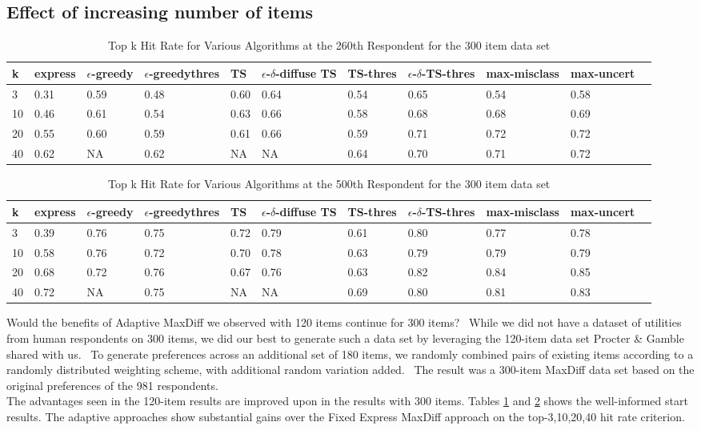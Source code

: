 \documentclass[nonblindrev]{informs3}
\newcommand{\fixedexpress}{\textbf{express}}
\newcommand{\egreedy}{$\epsilon$-\textbf{greedy}}
\newcommand{\egreedythres}{$\epsilon$-\textbf{greedythres}}
\newcommand{\mismin}{\textbf{max-misclass}}
\newcommand{\ts}{\textbf{TS} }
\newcommand{\edts}{$\epsilon$-$\delta$-\textbf{diffuse TS} }
\newcommand{\tsthres}{\textbf{TS-thres} }
\newcommand{\edtsthres}{$\epsilon$-$\delta$-\textbf{TS-thres} }
\newcommand{\uncert}{\textbf{max-uncert} }
\begin{document}
\subsection{Effect of increasing number of items}
\begin{table}
\begin{center}
\begin{tabular}{lllllllllll}
\hline   k &  \fixedexpress & \egreedy&\egreedythres&\ts&\edts&\tsthres&\edtsthres& \mismin& \uncert \\ \hline 
3&   0.31 &   0.59 & 0.48 & 0.60 &  0.64 & 0.54 & 0.65 & 0.54 &   0.58 \\ 
10 & 0.46 &   0.61 & 0.54 & 0.63  & 0.66 & 0.58 & 0.68 & 0.68  &   0.69 \\ 
20 & 0.55 &   0.60 & 0.59 &  0.61 & 0.66 & 0.59 & 0.71 &       0.72 &   0.72\\ 
40 & 0.62 &   NA & 0.62 & NA &  NA & 0.64 & 0.70 & 0.71 & 0.72 \end{tabular}
\end{center}
\caption{Top k Hit Rate for Various Algorithms at the 260th Respondent for the 300 item data set}
\label{table:300at260}
\end{table}

\begin{table}
\begin{center}
\begin{tabular}{lllllllllll}
\hline   k &  \fixedexpress & \egreedy&\egreedythres&\ts&\edts&\tsthres&\edtsthres& \mismin& \uncert  \\ \hline  
3 & 0.39 &  0.76 & 0.75 & 0.72 & 0.79 & 0.61 &  0.80 &  0.77 &0.78 \\
10 &  0.58 &   0.76 & 0.72 & 0.70 & 0.78 & 0.63 & 0.79 & 0.79 &   0.79\\
20 & 0.68 & 0.72 & 0.76 & 0.67 & 0.76 &  0.63 & 0.82 & 0.84 &    0.85 \\ 
40 & 0.72 &   NA & 0.75 & NA & NA & 0.69 & 0.80 &0.81 & 0.83 \end{tabular}
\end{center}
\caption{Top k Hit Rate for Various Algorithms at the 500th Respondent for the 300 item data set}
\label{table:300at500}
\end{table}
Would the benefits of Adaptive MaxDiff we observed with 120 items continue for 300 items?  While we did not have a dataset of utilities from human respondents on 300 items, we did our best to generate such a data set by leveraging the 120-item data set Procter \& Gamble shared with us.  To generate preferences across an additional set of 180 items, we randomly combined pairs of existing items according to a randomly distributed weighting scheme, with additional random variation added.  The result was a 300-item MaxDiff data set based on the original preferences of the 981 respondents.\\
The advantages seen in the 120-item results are improved upon in the results with 300 items. Tables \ref{table:300at260} and \ref{table:300at500} shows the well-informed start results. The adaptive approaches show substantial gains over the Fixed Express MaxDiff approach on the top-3,10,20,40 hit rate criterion.\\
\end{document}

